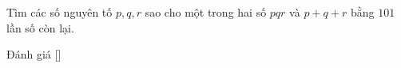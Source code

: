 \ifshowproblem
\begin{problem}\label{problem:NMC-2015-P2}
    Tìm các số nguyên tố \( p, q, r \) sao cho một trong hai số \( pqr \) và \( p + q + r \) bằng \( 101 \) lần số còn lại.
\end{problem}
\fi

\ifshowinfo
Đánh giá [\textbf{}]
\fi